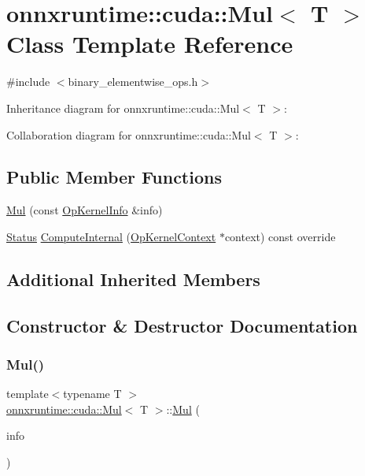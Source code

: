 \hypertarget{classonnxruntime_1_1cuda_1_1Mul}{}\section{onnxruntime\+:\+:cuda\+:\+:Mul$<$ T $>$ Class Template Reference}
\label{classonnxruntime_1_1cuda_1_1Mul}


{\ttfamily \#include $<$binary\+\_\+elementwise\+\_\+ops.\+h$>$}



Inheritance diagram for onnxruntime\+:\+:cuda\+:\+:Mul$<$ T $>$\+:


Collaboration diagram for onnxruntime\+:\+:cuda\+:\+:Mul$<$ T $>$\+:
\subsection*{Public Member Functions}
\begin{DoxyCompactItemize}
\item 
\mbox{\hyperlink{classonnxruntime_1_1cuda_1_1Mul_a614a5f6e97cc1993a388d9cc6f487fe4}{Mul}} (const \mbox{\hyperlink{classonnxruntime_1_1OpKernelInfo}{Op\+Kernel\+Info}} \&info)
\item 
\mbox{\hyperlink{classonnxruntime_1_1common_1_1Status}{Status}} \mbox{\hyperlink{classonnxruntime_1_1cuda_1_1Mul_acad0d0361e14828dec11252cbd07fead}{Compute\+Internal}} (\mbox{\hyperlink{classonnxruntime_1_1OpKernelContext}{Op\+Kernel\+Context}} $\ast$context) const override
\end{DoxyCompactItemize}
\subsection*{Additional Inherited Members}


\subsection{Constructor \& Destructor Documentation}
\mbox{\label{classonnxruntime_1_1cuda_1_1Mul_a614a5f6e97cc1993a388d9cc6f487fe4}} 
\subsubsection{\texorpdfstring{Mul()}{Mul()}}
{\footnotesize\ttfamily template$<$typename T $>$ \\
\mbox{\hyperlink{classonnxruntime_1_1cuda_1_1Mul}{onnxruntime\+::cuda\+::\+Mul}}$<$ T $>$\+::\mbox{\hyperlink{classonnxruntime_1_1cuda_1_1Mul}{Mul}} (\begin{DoxyParamCaption}\item[{const \mbox{\hyperlink{classonnxruntime_1_1OpKernelInfo}{Op\+Kernel\+Info}} \&}]{info }\end{DoxyParamCaption})\hspace{0.3cm}{\ttfamily [inline]}}



